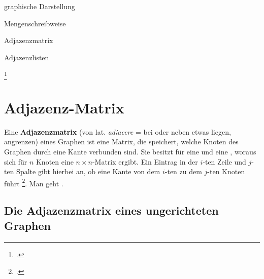 \documentclass{lehramt-informatik}
\begin{document}
\begin{compactitem}
\item graphische Darstellung
\item Mengenschreibweise
\item Adjazenzmatrix
\item Adjazenzlisten
\end{compactitem}
\footcite[Seite 4]{aud:fs:6}


%

\section{Adjazenz-Matrix}

Eine \textbf{Adjazenzmatrix} (von lat. \emph{adiacere} = bei oder neben
etwas liegen, angrenzen) eines Graphen ist eine Matrix, die speichert,
welche Knoten des Graphen durch eine Kante verbunden sind. Sie besitzt
für  eine  und eine ,
woraus sich für $n$ Knoten eine $n \times n$-Matrix ergibt. Ein Eintrag
in der $i$-ten Zeile und $j$-ten Spalte gibt hierbei an, ob eine Kante
von dem $i$-ten zu dem $j$-ten Knoten führt
\footcite{wiki:adjazenzmatrix}. Man geht .

%

\subsection{Die Adjazenzmatrix eines ungerichteten Graphen}
\end{document}

